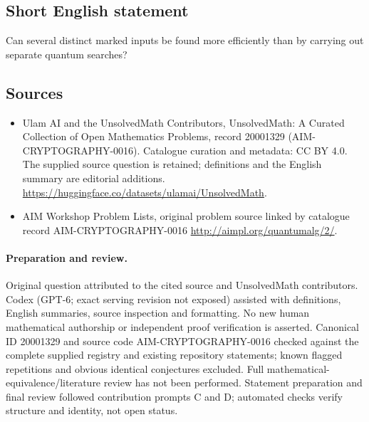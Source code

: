 \documentclass[11pt]{article}
\begin{document}
\subsection{Short English statement}
Can several distinct marked inputs be found more efficiently than by carrying out separate quantum searches?
\subsection{Sources}
\begin{itemize}
\item[\hypertarget{source:20001329:1}{S1}] Ulam AI and the UnsolvedMath Contributors, UnsolvedMath: A Curated Collection of Open Mathematics Problems, record 20001329 (AIM-CRYPTOGRAPHY-0016). Catalogue curation and metadata: CC BY 4.0. The supplied source question is retained; definitions and the English summary are editorial additions.
\url{https://huggingface.co/datasets/ulamai/UnsolvedMath}.
\item[\hypertarget{source:20001329:2}{S2}] AIM Workshop Problem Lists, original problem source linked by catalogue record AIM-CRYPTOGRAPHY-0016
\url{http://aimpl.org/quantumalg/2/}.
\end{itemize}
\paragraph{Preparation and review.}
Original question attributed to the cited source and UnsolvedMath contributors. Codex (GPT-6; exact serving revision not exposed) assisted with definitions, English summaries, source inspection and formatting. No new human mathematical authorship or independent proof verification is asserted. Canonical ID 20001329 and source code AIM-CRYPTOGRAPHY-0016 checked against the complete supplied registry and existing repository statements; known flagged repetitions and obvious identical conjectures excluded. Full mathematical-equivalence/literature review has not been performed. Statement preparation and final review followed contribution prompts C and D; automated checks verify structure and identity, not open status.
\label{end:20001329}
\end{document}
